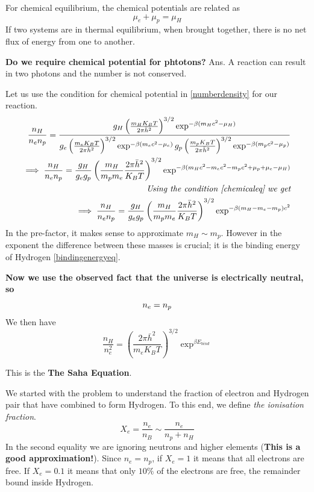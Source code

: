 \documentclass[12pt]{report}
\newcommand{\tbf}[1]{\textbf{#1}}
\newcommand{\tit}[1]{\textit{#1}}
\begin{document}
For chemical equilibrium, the chemical potentials are related as 
\begin{equation}\label{chemicaleq}
\mu_e + \mu_p = \mu_H
\end{equation}
If two systems are in thermal equilibrium, when brought together, there is no net flux of energy from one to another.

\tbf{Do we require chemical potential for phtotons?}
Ans. A reaction can result in two photons and the number is not conserved. 

Let us use the condition for chemical potential in \eqref{numberdensity} for our reaction.
\begin{eqnarray*}
\frac{n_H}{n_e n_p}=\frac{g_H\left(\frac{m_HK_BT}{2 \pi \bar{h}^2}\right)^{3/2} \exp^{-\beta (m_H c^2-\mu_H)}}{g_e\left(\frac{m_eK_BT}{2 \pi \bar{h}^2}\right)^{3/2} \exp^{-\beta (m_e c^2-\mu_e)} g_p\left(\frac{m_pK_BT}{2 \pi \bar{h}^2}\right)^{3/2} \exp^{-\beta (m_p c^2-\mu_p)}}\\
\implies \frac{n_H}{n_e n_p}=\frac{g_H}{g_e g_p}\left(\frac{m_H}{m_p m_e}\frac{2 \pi \bar{h}^2}{K_BT}\right)^{3/2}\exp^{-\beta (m_H c^2 -m_e c^2 -m_p c^2+\mu_p +\mu_e -\mu_H)}\\
 \tit{Using the condition \eqref{chemicaleq} we get}\\
\implies \frac{n_H}{n_e n_p}=\frac{g_H}{g_e g_p}\left(\frac{m_H}{m_p m_e}\frac{2 \pi \bar{h}^2}{K_BT}\right)^{3/2}\exp^{-\beta (m_H -m_e -m_p)c^2}\\
\end{eqnarray*}
In the pre-factor, it makes sense to approximate $m_H \sim m_p$. However in the exponent the difference between these masses is crucial; it is the binding energy of Hydrogen \eqref{bindingenergyeq}.

\tbf{Now we use the observed fact that the universe is electrically neutral, so}
\begin{equation}
n_e=n_p\\
\end{equation}
We then have
\begin{equation}\label{sahaeq}
\frac{n_H}{n_e^2}=\left(\frac{2 \pi \bar{h}^2}{m_e K_BT}\right)^{3/2}\exp^{\beta E_{bind}}
\end{equation}

This is the \tbf{The Saha Equation}.

We started with the problem to understand the fraction of electron and Hydrogen pair that have combined to form Hydrogen. To this end, we define \tit{the ionisation fraction}.
\begin{equation*}
X_e= \frac{n_e}{n_B} \sim \frac{n_e}{n_p + n_H}
\end{equation*}
In the second equality we are ignoring neutrons and higher elements (\tbf{This is a good approximation!}). Since $n_e=n_p$, if $X_e=1$ it means that all electrons are free. If $X_e=0.1$ it means that only $10 \%$ of the electrons are free, the remainder bound inside Hydrogen.
 
\end{document}
